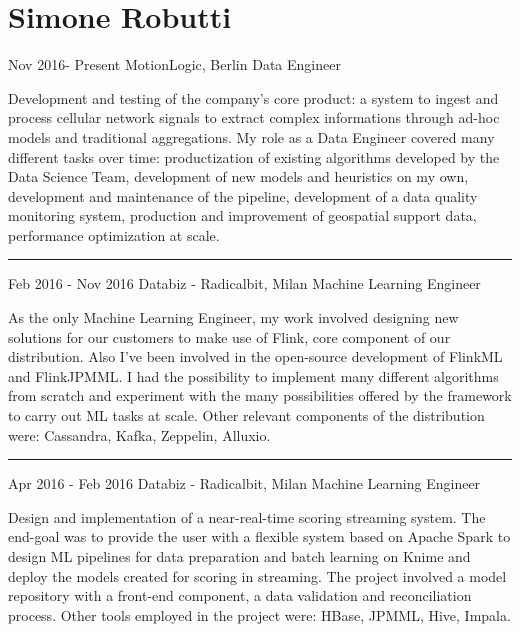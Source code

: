 \documentclass{tccv}
\begin{document}
\part{Simone Robutti}

\begin{eventlist}

\item{Nov 2016- Present}
     {MotionLogic, Berlin}
     {Data Engineer}

Development and testing of the company's core product: a system to ingest and process cellular network signals to extract complex informations through ad-hoc models and traditional aggregations. My role as a Data Engineer covered many different tasks over time: productization of existing algorithms developed by the Data Science Team, development of new models and heuristics on my own, development and maintenance of the pipeline, development of a data quality monitoring system, production and improvement of geospatial support data, performance optimization at scale.


\noindent\hfil\rule{0.3\textwidth}{.4pt}

\item{Feb 2016 - Nov 2016}
{Databiz - Radicalbit, Milan}
{Machine Learning Engineer}

As the only Machine Learning Engineer, my work involved designing new solutions for our customers to make use of Flink, core component of our distribution. Also I've been involved in the open-source development of FlinkML and FlinkJPMML. I had the possibility to implement many different algorithms from scratch and experiment with the many possibilities offered by the framework to carry out ML tasks at scale. Other relevant components of the distribution were: Cassandra, Kafka, Zeppelin, Alluxio.

\noindent\hfil\rule{0.3\textwidth}{.4pt}

\item{Apr 2016 - Feb 2016}
{Databiz - Radicalbit, Milan}
{Machine Learning Engineer}

Design and implementation of a near-real-time scoring streaming system. The end-goal was to provide the user with a flexible system based on Apache Spark to design ML pipelines for data preparation and batch learning on Knime and deploy the models created for scoring in streaming. The project involved a model repository with a front-end component, a data validation and reconciliation process. Other tools employed in the project were: HBase, JPMML, Hive, Impala.

\end{eventlist}
\end{document}
